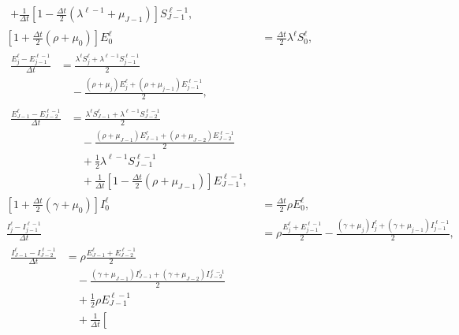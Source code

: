 \documentclass[USenglish]{article}
\begin{document}
\begin{subequations}
\begin{align}
\begin{split}
      + \frac{1}{\Delta t} \left[
        1 - \frac{\Delta t}{2} (\lambda^{\ell - 1} + \mu_{J - 1})
      \right] S_{J - 1}^{\ell - 1},
    \end{split}
    \\
    \left[1 + \frac{\Delta t}{2} (\rho + \mu_0)\right] E_0^{\ell}
    &= \frac{\Delta t}{2} \lambda^{\ell} S_0^{\ell},
    \\
    \begin{split}
      \frac{E_j^{\ell} - E_{j - 1}^{\ell - 1}}{\Delta t} &=
      \frac{\lambda^{\ell} S_j^{\ell} + \lambda^{\ell - 1} S_{j - 1}^{\ell - 1}}{2}
      \\ & \quad {}
      - \frac{(\rho + \mu_j) E_j^{\ell}
        + (\rho + \mu_{j - 1}) E_{j - 1}^{\ell - 1}}{2},
    \end{split}
    \\
    \begin{split}
      \frac{E_{J - 1}^{\ell} - E_{J - 2}^{\ell - 1}}{\Delta t} &=
      \frac{\lambda^{\ell} S_{J - 1}^{\ell}
        + \lambda^{\ell - 1} S_{J - 2}^{\ell - 1}}{2}
      \\ & \quad {}
      - \frac{(\rho + \mu_{J - 1}) E_{J - 1}^{\ell}
        + (\rho + \mu_{J - 2}) E_{J - 2}^{\ell - 1}}{2}
      \\ & \quad {}
      + \frac{1}{2} \lambda^{\ell - 1} S_{J - 1}^{\ell - 1}
      \\ & \quad {}
      + \frac{1}{\Delta t} \left[
        1 - \frac{\Delta t}{2} (\rho + \mu_{J - 1})
      \right] E_{J - 1}^{\ell - 1},
    \end{split}
    \\
    \left[1 + \frac{\Delta t}{2} (\gamma + \mu_0)\right] I_0^{\ell}
    &= \frac{\Delta t}{2} \rho E_0^{\ell},
    \\
    \frac{I_j^{\ell} - I_{j - 1}^{\ell - 1}}{\Delta t} &=
    \rho \frac{E_j^{\ell} + E_{j - 1}^{\ell - 1}}{2}
    - \frac{(\gamma + \mu_j) I_j^{\ell}
      + (\gamma + \mu_{j - 1}) I_{j - 1}^{\ell - 1}}{2},
    \\
    \begin{split}
      \frac{I_{J - 1}^{\ell} - I_{J - 2}^{\ell - 1}}{\Delta t} &=
      \rho \frac{E_{J - 1}^{\ell} + E_{J - 2}^{\ell - 1}}{2}
      \\ & \quad {}
      - \frac{(\gamma + \mu_{J - 1}) I_{J - 1}^{\ell}
        + (\gamma + \mu_{J - 2}) I_{J - 2}^{\ell - 1}}{2}
      \\ & \quad {}
      + \frac{1}{2} \rho E_{J - 1}^{\ell - 1}
      \\ & \quad {}
      + \frac{1}{\Delta t} \left[

\end{split}
\end{align}
\end{subequations}
\end{document}
